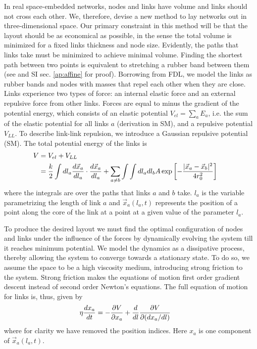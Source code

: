 \documentclass[nofootinbib,preprint,floatfix,endfloats]{revtex4} %
\begin{document}
In real space-embedded networks, nodes and links have volume and links should not cross each other.
We, therefore, devise a new method to lay networks out in three-dimensional space. 
Our primary constraint in this method will be that the layout should be as economical as possible, in the sense the total volume is minimized for a fixed links thickness and node size. 
Evidently, the paths that links take must be minimized to achieve minimal volume. 
Finding the shortest path between two points is equivalent to stretching a rubber band between them (see \cite{novikov1984} and SI sec. \ref{ap:affine} for proof).
Borrowing from FDL, we model the links as rubber bands 
and nodes with masses that repel each other when they are close. 
Links experience two types of force: an internal elastic force and an external repulsive force from other links.     
Forces are equal to minus the gradient of the potential energy,
which consists of an elastic potential $V_{el}= \sum_a E_a$, i.e. the sum of the elastic potential for all links $a$
(derivation in SM),
and a repulsive potential $V_{LL}$. 
To describe link-link repulsion, we introduce a Gaussian repulsive potential (SM). 
The total potential energy of the links is
\begin{align}
    V &= V_{el} + V_{LL} \cr 
    &= {k\over 2}\int dl_a {d\vec{x}_a\over dl_a} \cdot {d\vec{x}_a\over dl_a} + 
    \sum_{a\ne b} \int \int dl_adl_b 
    A \exp\left[- {|\vec{x}_a-\vec{x}_b|^2 \over 4 r_0^2}\right] \label{eq:Vfull}
\end{align}
where the integrals are over the paths that links $a$ and $b$ take. $l_a$ is the variable parametrizing the length of link $a$ and  $\vec{x}_a(l_a,t)$ represents the position of a point along the core of the link at a point at a given value of the parameter $l_a$.  

To produce the desired layout we must find the optimal configuration of nodes and links under the influence of the forces by dynamically evolving the system till it reaches minimum potential. 
We model the dynamics as a dissipative process, thereby allowing the system to converge towards a stationary state. 
To do so, we assume the space to be a high viscosity medium, introducing strong friction to the system.
Strong friction makes the equations of motion first order gradient descent instead of second order Newton's equations.
The full equation of motion for links is, thus, given by 
\begin{align}
    \eta {dx_a \over dt} & =  -{\partial V \over \partial x_a} + {d\over dl} {\partial V \over \partial (dx_a /dl)}   \label{eq:Langevin0}
\end{align}
where for clarity we have removed the position indices. Here $x_a$ is one component of $\vec{x}_a(l_a,t)$. 
\end{document}
